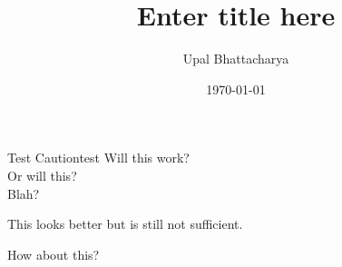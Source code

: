 \documentclass[a4paper]{article}
\author{Upal Bhattacharya}
\date{\today}
\title{Enter title here}
\begin{document}
\maketitle

\linenumbers

  \begin{caution}{Test Caution}{test}
    Will this work? \\
    Or will this? \\
    Blah?
  \end{caution}

This looks better but is still not sufficient.

How about this?
\end{document}
